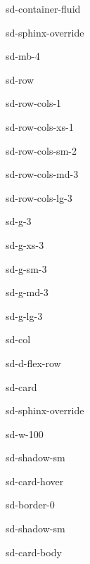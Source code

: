 \documentclass[a4paper,10pt,english]{sphinxmanual}
\begin{document}
\begin{sphinxuseclass}{sd-container-fluid}
\begin{sphinxuseclass}{sd-sphinx-override}
\begin{sphinxuseclass}{sd-mb-4}
\begin{sphinxuseclass}{sd-row}
\begin{sphinxuseclass}{sd-row-cols-1}
\begin{sphinxuseclass}{sd-row-cols-xs-1}
\begin{sphinxuseclass}{sd-row-cols-sm-2}
\begin{sphinxuseclass}{sd-row-cols-md-3}
\begin{sphinxuseclass}{sd-row-cols-lg-3}
\begin{sphinxuseclass}{sd-g-3}
\begin{sphinxuseclass}{sd-g-xs-3}
\begin{sphinxuseclass}{sd-g-sm-3}
\begin{sphinxuseclass}{sd-g-md-3}
\begin{sphinxuseclass}{sd-g-lg-3}
\begin{sphinxuseclass}{sd-col}
\begin{sphinxuseclass}{sd-d-flex-row}
\begin{sphinxuseclass}{sd-card}
\begin{sphinxuseclass}{sd-sphinx-override}
\begin{sphinxuseclass}{sd-w-100}
\begin{sphinxuseclass}{sd-shadow-sm}
\begin{sphinxuseclass}{sd-card-hover}
\begin{sphinxuseclass}{sd-border-0}
\begin{sphinxuseclass}{sd-shadow-sm}
\begin{sphinxuseclass}{sd-card-body}
\end{sphinxuseclass}{\hyperref[\detokenize{api/io-utils::doc}]{}}
\end{sphinxuseclass}
\end{sphinxuseclass}
\end{sphinxuseclass}
\end{sphinxuseclass}
\end{sphinxuseclass}
\end{sphinxuseclass}
\end{sphinxuseclass}
\end{sphinxuseclass}
\end{sphinxuseclass}
\end{sphinxuseclass}
\end{sphinxuseclass}
\end{sphinxuseclass}
\end{sphinxuseclass}
\end{sphinxuseclass}
\end{sphinxuseclass}
\end{sphinxuseclass}
\end{sphinxuseclass}
\end{sphinxuseclass}
\end{sphinxuseclass}
\end{sphinxuseclass}
\end{sphinxuseclass}
\end{sphinxuseclass}
\end{sphinxuseclass}
\sphinxstepscope
\end{document}
